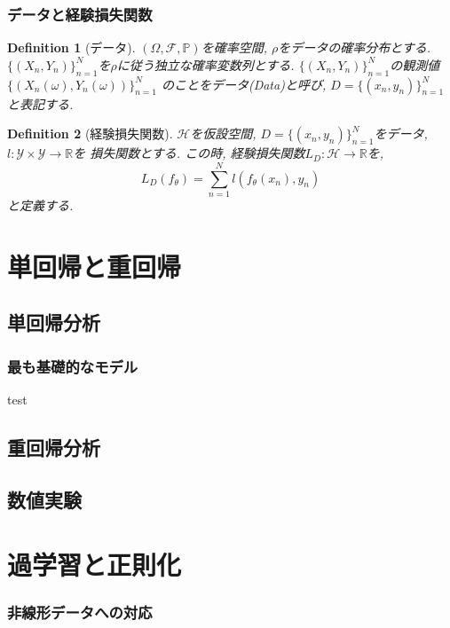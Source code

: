 \documentclass[dvipdfmx,11pt]{beamer}		%
\newtheorem{defi}{Definition}
\newcommand{\R}{\mathbb{R}}
\newcommand{\Y}{\mathcal{Y}}
\newcommand{\Hil}{\mathcal{H}}
\begin{document}
    \begin{frame}
        \frametitle{データと経験損失関数}
        \begin{defi}[データ]
            $(\Omega, \mathcal{F}, \mathbb{P})$を確率空間, $\rho$をデータの確率分布とする.
            $\{(X_n, Y_n)\}_{n = 1}^{N}$を$\rho$に従う独立な確率変数列とする. $\{(X_n, Y_n)\}_{n = 1}^{N}$の観測値$\{(X_n(\omega), Y_n(\omega))\}_{n = 1}^{N}$
            のことをデータ(Data)と呼び, $D = \{(x_n, y_n)\}_{n = 1}^{N}$と表記する.
        \end{defi}
        \begin{defi}[経験損失関数]
            $\Hil$を仮設空間, $D = \{(x_n, y_n)\}_{n = 1}^{N}$をデータ, $l:\Y\times\Y\to\R$を
            損失関数とする. この時, 経験損失関数$L_{D}:\Hil\to\R$を,
            \begin{equation*}
                L_{D}(f_{\theta}) = \sum_{n = 1}^{N}l(f_{\theta}(x_n), y_n)
            \end{equation*}
            と定義する. 
        \end{defi}
        
    
    \end{frame}
    \section{単回帰と重回帰}
    \subsection{単回帰分析}
    \begin{frame}\frametitle{最も基礎的なモデル}
        test
    \end{frame}
    
    \subsection{重回帰分析}
    \subsection{数値実験}
    \section{過学習と正則化}
    \begin{frame}\frametitle{非線形データへの対応}
        
    \end{frame}
\end{document}
